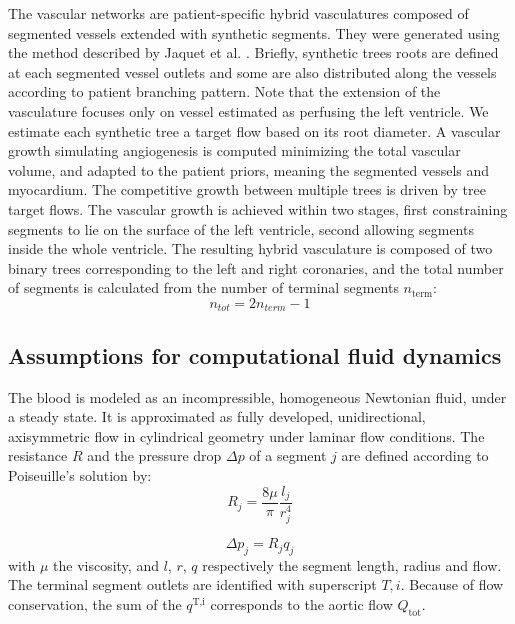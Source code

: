 \documentclass[journal]{IEEEtran}
\newcommand{\joinus}[2]{\ensuremath{#1_{\text{#2}}}}
\newcommand{\joinup}[2]{\ensuremath{#1^{\text{#2}}}}
\begin{document}
The vascular networks are patient-specific hybrid vasculatures composed of segmented vessels extended with synthetic segments. They were generated using the method described by Jaquet et al. \cite{jaquet2018generation}. Briefly, synthetic trees roots are defined at each segmented vessel outlets and some are also distributed along the vessels according to patient branching pattern. Note that the extension of the vasculature focuses only on vessel estimated as perfusing the left ventricle. We estimate each synthetic tree a target flow based on its root diameter. A vascular growth simulating angiogenesis is computed minimizing the total vascular volume, and adapted to the patient priors, meaning the segmented vessels and myocardium. The competitive growth between multiple trees is driven by tree target flows. The vascular growth is achieved within two stages, first constraining segments to lie on the surface of the left ventricle, second allowing segments inside the whole ventricle.
The resulting hybrid vasculature is composed of two binary trees corresponding to the left and right coronaries, and the total number of segments is calculated from the number of terminal segments \joinus{n}{term}:
\begin{equation}
n_{tot} = 2 n_{term} -1
\end{equation}

  

\subsection{Assumptions for computational fluid dynamics}
The blood is modeled as an incompressible, homogeneous Newtonian fluid, under a steady state. It is approximated as fully developed, unidirectional, axisymmetric flow in cylindrical geometry under laminar flow conditions. 
The resistance $R$ and the pressure drop $\Delta p$ of a segment $j$ are defined according to Poiseuille's solution by:
\begin{equation}\label{eq:resistance}
R_j = \frac{8\mu}{\pi}\frac{l_j}{r_j^4} 
\end{equation}

\begin{equation}\label{Pdrop}
\Delta p_j = R_j q_j
\end{equation}
with $\mu$ the viscosity, and $l$, $r$, $q$ respectively the segment length, radius and flow.
The terminal segment outlets are identified with superscript $T,i$.
Because of flow conservation, the sum of the $\joinup{q}{T,i}$ corresponds to the aortic flow $\joinus{Q}{tot}$. 
\end{document}
